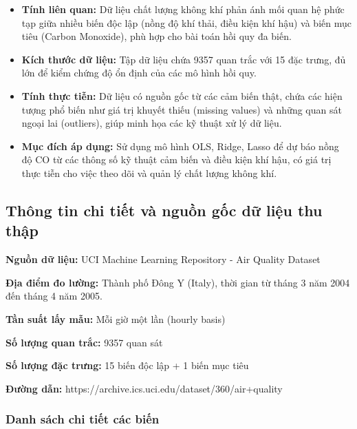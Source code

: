 \documentclass[12pt,a4paper]{report}
\begin{document}
\begin{itemize}
    \item \textbf{Tính liên quan:} Dữ liệu chất lượng không khí phản ánh mối quan hệ phức tạp giữa nhiều biến độc lập (nồng độ khí thải, điều kiện khí hậu) và biến mục tiêu (Carbon Monoxide), phù hợp cho bài toán hồi quy đa biến.
    \item \textbf{Kích thước dữ liệu:} Tập dữ liệu chứa 9357 quan trắc với 15 đặc trưng, đủ lớn để kiểm chứng độ ổn định của các mô hình hồi quy.
    \item \textbf{Tính thực tiễn:} Dữ liệu có nguồn gốc từ các cảm biến thật, chứa các hiện tượng phổ biến như giá trị khuyết thiếu (missing values) và những quan sát ngoại lai (outliers), giúp minh họa các kỹ thuật xử lý dữ liệu.
    \item \textbf{Mục đích áp dụng:} Sử dụng mô hình OLS, Ridge, Lasso để dự báo nồng độ CO từ các thông số kỹ thuật cảm biến và điều kiện khí hậu, có giá trị thực tiễn cho việc theo dõi và quản lý chất lượng không khí.
\end{itemize}

\subsection{Thông tin chi tiết và nguồn gốc dữ liệu thu thập}
\begin{tcolorbox}[colback=infobox, colframe=infoborder, boxrule=1pt, left=5pt, right=5pt, top=5pt, bottom=5pt]
\textbf{Nguồn dữ liệu:} UCI Machine Learning Repository - Air Quality Dataset
 
\textbf{Địa điểm đo lường:} Thành phố Đông Y (Italy), thời gian từ tháng 3 năm 2004 đến tháng 4 năm 2005.
 
\textbf{Tần suất lấy mẫu:} Mỗi giờ một lần (hourly basis)
 
\textbf{Số lượng quan trắc:} 9357 quan sát
 
\textbf{Số lượng đặc trưng:} 15 biến độc lập + 1 biến mục tiêu

\textbf{Đường dẫn:} https://archive.ics.uci.edu/dataset/360/air+quality
\end{tcolorbox}
\subsubsection{Danh sách chi tiết các biến}
 
\end{document}
